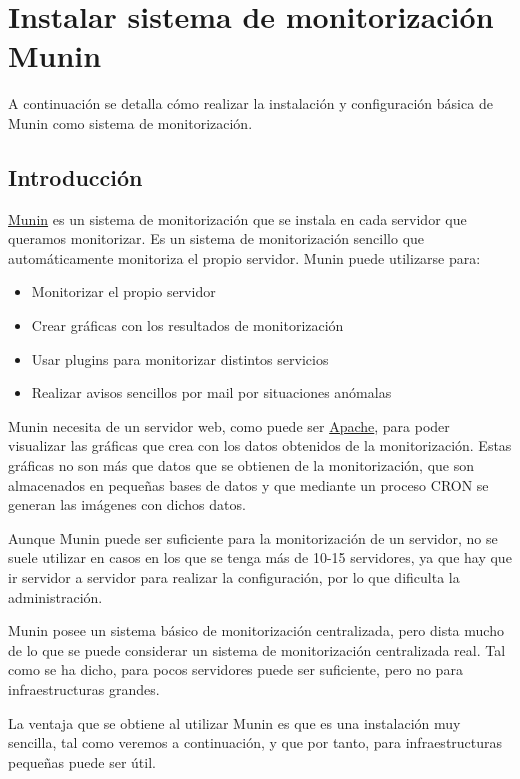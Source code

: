 \chapter{Instalar sistema de monitorización Munin}
A continuación se detalla cómo realizar la instalación y configuración básica de Munin como sistema de monitorización.

\section{Introducción}

\href{https://munin-monitoring.org/}{Munin} es un sistema de monitorización que se instala en cada servidor que queramos monitorizar. Es un sistema de monitorización sencillo que automáticamente monitoriza el propio servidor. Munin puede utilizarse para:

\begin{itemize}
    \item Monitorizar el propio servidor
    \item Crear gráficas con los resultados de monitorización
    \item Usar plugins para monitorizar distintos servicios
    \item Realizar avisos sencillos por mail por situaciones anómalas
\end{itemize}

Munin necesita de un servidor web, como puede ser \href{https://httpd.apache.org/}{Apache}, para poder visualizar las gráficas que crea con los datos obtenidos de la monitorización. Estas gráficas no son más que datos que se obtienen de la monitorización, que son almacenados en pequeñas bases de datos y que mediante un proceso CRON se generan las imágenes con dichos datos.

Aunque Munin puede ser suficiente para la monitorización de un servidor, no se suele utilizar en casos en los que se tenga más de 10-15 servidores, ya que hay que ir servidor a servidor para realizar la configuración, por lo que dificulta la administración.

Munin posee un sistema básico de monitorización centralizada, pero dista mucho de lo que se puede considerar un sistema de monitorización centralizada real. Tal como se ha dicho, para pocos servidores puede ser suficiente, pero no para infraestructuras grandes.

La ventaja que se obtiene al utilizar Munin es que es una instalación muy sencilla, tal como veremos a continuación, y que por tanto, para infraestructuras pequeñas puede ser útil.

